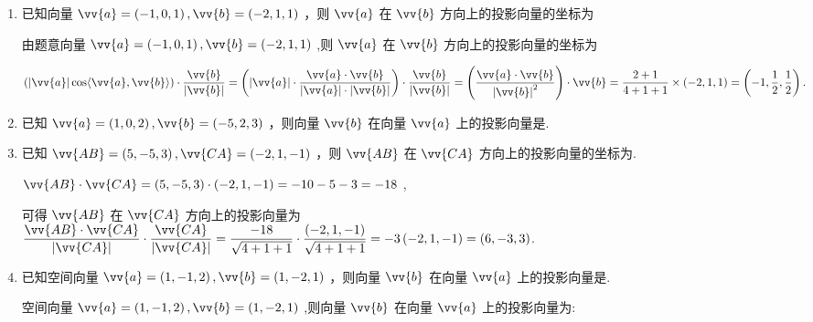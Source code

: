 \begin{enumerate}
    \item 已知向量 $\vv{a} = \left( {-1,0,1}\right) ,\vv{b} = \left( {-2,1,1}\right)$ ，则 $\vv{a}$ 在 $\vv{b}$ 方向上的投影向量的坐标为
    \begin{jieda}
        由题意向量 $\vv{a} = \left( {-1,0,1}\right) ,\vv{b} = \left( {-2,1,1}\right)$ ,则 $\vv{a}$ 在 $\vv{b}$ 方向上的投影向量的坐标为

        $\left( {\left| \vv{a}\right| \cos \langle \vv{a},\vv{b}\rangle }\right)  \cdot  \dfrac{\vv{b}}{\left| \vv{b}\right| } = \left( {\left| \vv{a}\right|  \cdot  \dfrac{\vv{a} \cdot  \vv{b}}{\left| \vv{a}\right|  \cdot  \left| \vv{b}\right| }}\right)  \cdot  \dfrac{\vv{b}}{\left| \vv{b}\right| } = \left( \dfrac{\vv{a} \cdot  \vv{b}}{{\left| \vv{b}\right| }^{2}}\right)  \cdot  \vv{b} = \dfrac{2 + 1}{4 + 1 + 1} \times  \left( {-2,1,1}\right)  = \left( {-1,\dfrac{1}{2},\dfrac{1}{2}}\right).$
    \end{jieda}
    
    \item 已知 $\vv{a} = \left( {1,0,2}\right) ,\vv{b} = \left( {-5,2,3}\right)$ ，则向量 $\vv{b}$ 在向量 $\vv{a}$ 上的投影向量是.
    
    \item 已知 $\vv{AB} = \left( {5, - 5,3}\right) ,\vv{CA} = \left( {-2,1, - 1}\right)$ ，则 $\vv{AB}$ 在 $\vv{CA}$ 方向上的投影向量的坐标为.
    \begin{jieda}
        $\vv{AB} \cdot  \vv{CA} = \left( {5, - 5,3}\right)  \cdot  \left( {-2,1, - 1}\right)  =  - {10} - 5 - 3 =  - {18}$ ,

        可得 $\vv{AB}$ 在 $\vv{CA}$ 方向上的投影向量为 $\dfrac{\vv{AB} \cdot  \vv{CA}}{\left| \vv{CA}\right| } \cdot  \dfrac{\vv{CA}}{\left| \vv{CA}\right| } = \dfrac{-{18}}{\sqrt{4 + 1 + 1}} \cdot  \dfrac{\left( -2,1, - 1\right) }{\sqrt{4 + 1 + 1}} =  - 3\left( {-2,1, - 1}\right)  = \left( {6, - 3,3}\right)$.
    \end{jieda}
    
    \item 已知空间向量 $\vv{a} = \left( {1, - 1,2}\right) ,\vv{b} = \left( {1, - 2,1}\right)$ ，则向量 $\vv{b}$ 在向量 $\vv{a}$ 上的投影向量是.
    \begin{jieda}
        空间向量 $\vv{a} = \left( {1, - 1,2}\right) ,\vv{b} = \left( {1, - 2,1}\right)$ ,则向量 $\vv{b}$ 在向量 $\vv{a}$ 上的投影向量为:
        

\end{jieda}
\end{enumerate}
